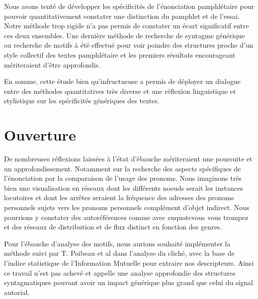 Nous avons tenté de développer les spécificités de l'énonciation pamphlétaire pour pouvoir quantitativement constater une distinction du pamphlet et de l'essai. Notre méthode trop rigide n'a pas permis de constater un écart significatif entre ces deux ensembles. 
Une dernière méthode de recherche de syntagme générique ou recherche de motifs à été effectué pour voir poindre des structures proche d'un style collectif des textes pamphlétaire et les premiers résultats encourageant mériteraient d'être approfondis.

En somme, cette étude bien qu'infructueuse a permis de déployer un dialogue entre des méthodes quantitatives très diverse et une réflexion linguistique et stylistique sur les spécificités génériques des textes.

\section{Ouverture}


De nombreuses réflexions laissées à l'état d'ébauche mériteraient une poursuite et un approfondissement. Notamment sur la recherche des aspects spécifiques de l'énonciation par la comparaison de l'usage des pronoms. Nous imaginons très bien une visualisation en réseaux dont les différents noeuds serait les instances locutoires et dont les arrêtes seraient la fréquence des adresses des pronoms personnels sujets vers les pronoms personnels complément d'objet indirect. Nous pourrions y constater des autoréférences comme avec enquote{vous vous trompez} et des réseaux de distribution et de flux distinct en fonction des genres.

Pour l'ébauche d'analyse des motifs, nous aurions souhaité implémenter la méthode suivi par T. Poibeau et al dans l'analyse du cliché, avec la base de l’indice statistique de l’Information Mutuelle pour extraire nos descripteurs. 
Ainsi ce travail n'est pas achevé et appelle une analyse approfondie des structures syntagmatiques pouvant avoir un impact générique plus grand que celui du signal autorial.